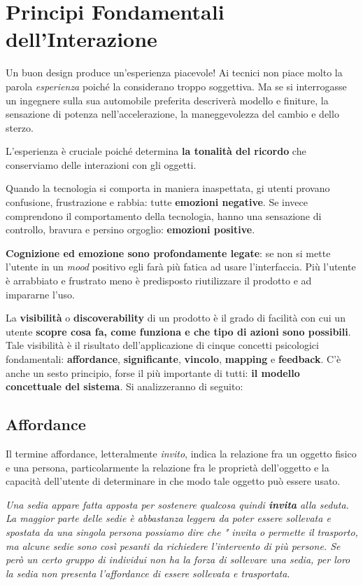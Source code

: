 \documentclass[a4paper,11pt,oneside]{book}
\begin{document}
\pagebreak

\chapter{Principi Fondamentali dell'Interazione}
Un buon design produce un'esperienza piacevole! Ai tecnici non piace molto la parola \textit{esperienza} poiché la considerano troppo soggettiva. Ma se si interrogasse un ingegnere sulla sua automobile preferita descriverà modello e finiture, la sensazione di potenza nell'accelerazione, la maneggevolezza del cambio e dello sterzo.

L'esperienza è cruciale poiché determina \textbf{la tonalità del ricordo} che conserviamo delle interazioni con gli oggetti.

Quando la tecnologia si comporta in maniera inaspettata, gi utenti provano confusione, frustrazione e rabbia: tutte \textbf{emozioni negative}. Se invece comprendono il comportamento della tecnologia, hanno una sensazione di controllo, bravura e persino orgoglio: \textbf{emozioni positive}.

\textbf{Cognizione ed emozione sono profondamente legate}: se non si mette l'utente in un \textit{mood} positivo egli farà più fatica ad usare l'interfaccia. Più l'utente è arrabbiato e frustrato meno è predisposto riutilizzare il prodotto e ad impararne l'uso.

La \textbf{visibilità} o \textbf{discoverability} di un prodotto è il grado di facilità con cui un utente \textbf{scopre cosa fa, come funziona e che tipo di azioni sono possibili}. Tale visibilità è il risultato dell'applicazione di cinque concetti psicologici fondamentali: \textbf{affordance}, \textbf{significante}, \textbf{vincolo}, \textbf{mapping} e \textbf{feedback}. C'è anche un sesto principio, forse il più importante di tutti: \textbf{il modello concettuale del sistema}. Si analizzeranno di seguito:

\section{Affordance}
Il termine affordance, letteralmente \textit{invito}, indica la relazione fra un oggetto fisico e una persona, particolarmente la relazione fra le proprietà dell'oggetto e la capacità dell'utente di determinare in che modo tale oggetto può essere usato.

\textit{Una sedia appare fatta apposta per sostenere qualcosa quindi \textbf{invita} alla seduta. La maggior parte delle sedie è abbastanza leggera da poter essere sollevata e spostata da una singola persona possiamo dire che "
	invita o permette il trasporto, ma alcune sedie sono così pesanti da richiedere l'intervento di più persone. Se però un certo gruppo di individui non ha la forza di sollevare una sedia, per loro la sedia non presenta l'affordance di essere sollevata e trasportata}.
\end{document}
